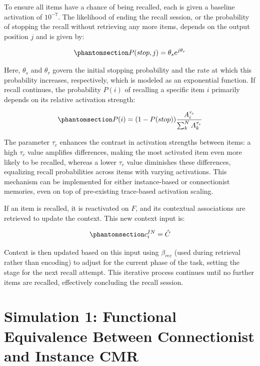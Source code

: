 \documentclass[
  letterpaper,
  11pt,
  english,
  singlespacing,
  headsepline]{MastersDoctoralThesis}
\begin{document}
To ensure all items have a chance of being recalled, each is given a
baseline activation of \(10^{-7}\). The likelihood of ending the recall
session, or the probability of stopping the recall without retrieving
any more items, depends on the output position \(j\) and is given by:

\begin{equation}\phantomsection\label{eq-16}{
P(stop, j) = \theta_s e^{j\theta_r}
}\end{equation}

Here, \(\theta_s\) and \(\theta_r\) govern the initial stopping
probability and the rate at which this probability increases,
respectively, which is modeled as an exponential function. If recall
continues, the probability \(P(i)\) of recalling a specific item \(i\)
primarily depends on its relative activation strength:

\begin{equation}\phantomsection\label{eq-17}{
P(i) = (1-P(stop))\frac{A^{\tau_{c}}_i}{\sum_{k}^{N}A^{\tau_{c}}_k}
}\end{equation}

The parameter \(\tau_{c}\) enhances the contrast in activation strengths
between items: a high \(\tau_{c}\) value amplifies differences, making
the most activated item even more likely to be recalled, whereas a lower
\(\tau_{c}\) value diminishes these differences, equalizing recall
probabilities across items with varying activations. This mechanism can
be implemented for either instance-based or connectionist memories, even
on top of pre-existing trace-based activation scaling.

If an item is recalled, it is reactivated on \(F\), and its contextual
associations are retrieved to update the context. This new context input
is:

\begin{equation}\phantomsection\label{eq-18}{
c^{IN}_{i} = \hat{C}
}\end{equation}

Context is then updated based on this input using \(\beta_{rec}\) (used
during retrieval rather than encoding) to adjust for the current phase
of the task, setting the stage for the next recall attempt. This
iterative process continues until no further items are recalled,
effectively concluding the recall session.

\section{Simulation 1: Functional Equivalence Between Connectionist and
Instance
CMR}\label{simulation-1-functional-equivalence-between-connectionist-and-instance-cmr}
\end{document}
